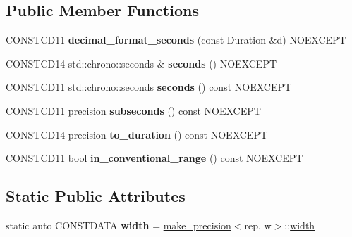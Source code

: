 \subsection*{Public Member Functions}
\begin{DoxyCompactItemize}
\item 
\mbox{\label{classdate_1_1detail_1_1decimal__format__seconds_a4676803cdafd9fc94ce83778761b4efe}} 
C\+O\+N\+S\+T\+C\+D11 {\bfseries decimal\+\_\+format\+\_\+seconds} (const Duration \&d) N\+O\+E\+X\+C\+E\+PT
\item 
\mbox{\label{classdate_1_1detail_1_1decimal__format__seconds_a86102b53dc7c21c84650401dc311839e}} 
C\+O\+N\+S\+T\+C\+D14 std\+::chrono\+::seconds \& {\bfseries seconds} () N\+O\+E\+X\+C\+E\+PT
\item 
\mbox{\label{classdate_1_1detail_1_1decimal__format__seconds_a28e60ff38ed6a4c624acd6a9cb1416d4}} 
C\+O\+N\+S\+T\+C\+D11 std\+::chrono\+::seconds {\bfseries seconds} () const N\+O\+E\+X\+C\+E\+PT
\item 
\mbox{\label{classdate_1_1detail_1_1decimal__format__seconds_a3a53bee1d7e21d0034b6c2b845e3fd70}} 
C\+O\+N\+S\+T\+C\+D11 precision {\bfseries subseconds} () const N\+O\+E\+X\+C\+E\+PT
\item 
\mbox{\label{classdate_1_1detail_1_1decimal__format__seconds_aa8f5fe78f580a335a0aa56d48d4fbf71}} 
C\+O\+N\+S\+T\+C\+D14 precision {\bfseries to\+\_\+duration} () const N\+O\+E\+X\+C\+E\+PT
\item 
\mbox{\label{classdate_1_1detail_1_1decimal__format__seconds_a67d3fda6ee99a818f348aa88772640ec}} 
C\+O\+N\+S\+T\+C\+D11 bool {\bfseries in\+\_\+conventional\+\_\+range} () const N\+O\+E\+X\+C\+E\+PT
\end{DoxyCompactItemize}
\subsection*{Static Public Attributes}
\begin{DoxyCompactItemize}
\item 
\mbox{\label{classdate_1_1detail_1_1decimal__format__seconds_ab2cb745fcdedebec1e1b217ae191efa4}} 
static auto C\+O\+N\+S\+T\+D\+A\+TA {\bfseries width} = \mbox{\hyperlink{structdate_1_1detail_1_1make__precision}{make\+\_\+precision}}$<$rep, w$>$\+::\mbox{\hyperlink{structdate_1_1detail_1_1width}{width}}
\end{DoxyCompactItemize}

